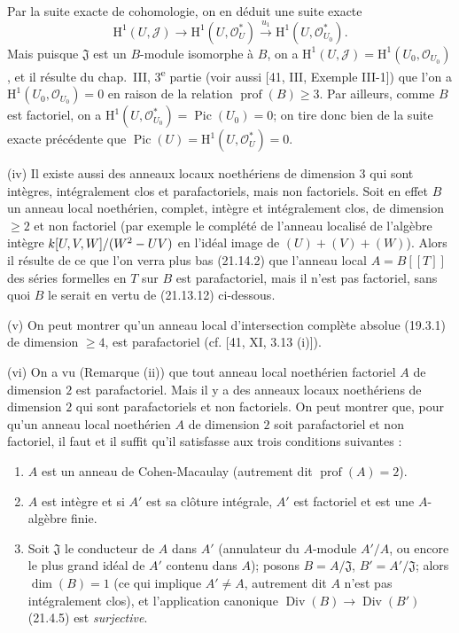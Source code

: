 \begin{examples}[21.13.9]
Par la suite exacte de cohomologie, on en déduit une suite exacte
\[
\label{IV.21.13.9.1}
  \mathrm H^1(U,\mathscr J)\longrightarrow\mathrm H^1(U,\mathcal O_U^*)
  \xrightarrow{u_1}\mathrm H^1(U,\mathcal O_{U_0}^*).
  \tag{21.13.9.1}
\]
Mais puisque $\mathfrak J$ est un $B$-module isomorphe à $B$, on a
$\mathrm H^1(U,\mathscr J)=\mathrm H^1(U_0,\mathcal O_{U_0})$, et il résulte du
chap.~III, 3\textsuperscript{e} partie (voir aussi [41, III, Exemple III-1]) que l'on a
$\mathrm H^1(U_0,\mathcal O_{U_0})=0$ en raison de la relation
$\operatorname{prof}(B)\geq3$. Par ailleurs, comme $B$ est factoriel, on a
$\mathrm H^1(U,\mathcal O_{U_0}^*)=\operatorname{Pic}(U_0)=0$; on tire donc bien de
la suite exacte précédente que
$\operatorname{Pic}(U)=\mathrm H^1(U,\mathcal O_U^*)=0$.

(iv) Il existe aussi des anneaux locaux noethériens de dimension $3$ qui sont
intègres, intégralement clos et parafactoriels, mais non factoriels. Soit en effet $B$
un anneau local noethérien, complet, intègre et intégralement clos, de dimension
$\geq2$ et non factoriel (par exemple le complété de l'anneau localisé de l'algèbre
intègre $k[U,V,W]/(W^2- UV)$ en l'idéal image de $(U)+(V)+(W)$). Alors il résulte de
ce que l'on verra plus bas (21.14.2) que l'anneau local $A=B[[T]]$ des séries formelles
en $T$ sur $B$ est parafactoriel, mais il n'est pas factoriel, sans quoi $B$ le serait
en vertu de (21.13.12) ci-dessous.

(v) On peut montrer qu'un anneau local d'intersection complète absolue (19.3.1) de
dimension $\geq4$, est parafactoriel (cf. [41, XI, 3.13 (i)]).

(vi) On a vu (Remarque (ii)) que tout anneau local noethérien factoriel $A$ de
dimension $2$ est parafactoriel. Mais il y a des anneaux locaux noethériens de
dimension $2$ qui sont parafactoriels et non factoriels. On peut montrer que, pour
qu'un anneau local noethérien $A$ de dimension $2$ soit parafactoriel et non
factoriel, il faut et il suffit qu'il satisfasse aux trois conditions suivantes :
\begin{enumerate}[label=\arabic*\textsuperscript{o}]
  \item $A$ est un anneau de Cohen-Macaulay (autrement dit
  $\operatorname{prof}(A)=2$).
  \item $A$ est intègre et si $A'$ est sa clôture intégrale, $A'$ est factoriel et est
  une $A$-algèbre finie.
  \item Soit $\mathfrak J$ le conducteur de $A$ dans $A'$ (annulateur du $A$-module
  $A'/A$, ou encore le plus grand idéal de $A'$ contenu dans $A$); posons
  $B=A/\mathfrak J$, $B'=A'/\mathfrak J$; alors $\dim(B)=1$ (ce qui implique
  $A'\neq A$, autrement dit $A$ n'est pas intégralement clos), et l'application
  canonique $\operatorname{Div}(B)\to\operatorname{Div}(B')$ (21.4.5) est
  \emph{surjective}.
\end{enumerate}


\end{examples}

